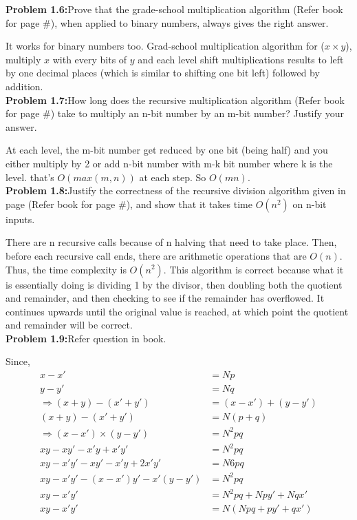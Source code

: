 \documentclass[11pt]{article}
\begin{document}
	\textbf{Problem 1.6:}Prove that the grade-school multiplication algorithm (Refer book for page \#), when applied to binary numbers, always gives the right answer.
	
	It works for binary numbers too. Grad-school multiplication algorithm for ($x\times y$), multiply $x$ with every bits of $y$ and each level shift multiplications results to left by one decimal places (which is similar to shifting one bit left) followed by addition.\\
	
	\textbf{Problem 1.7:}How long does the recursive multiplication algorithm (Refer book for page \#) take to multiply	an n-bit number by an m-bit number? Justify your answer.
	
	At each level, the m-bit number get reduced by one bit (being half) and you either multiply by 2 or add n-bit number with m-k bit number where k is the level. that's $O(max(m,n))$ at each step. So $O(mn)$.\\
	
	\textbf{Problem 1.8:}Justify the correctness of the recursive division algorithm given in page (Refer book for page \#), and show that it takes time $O(n^2)$ on n-bit inputs.	
	
	There are n recursive calls because of n halving that need to take place. Then, before each recursive call ends, there are arithmetic operations that are $O(n)$.
	Thus, the time complexity is $O(n^2)$. This algorithm is correct because what it is essentially doing is dividing 1 by the divisor, then doubling both the quotient and remainder, and then checking to see if the remainder has overflowed. It continues upwards until the original value is reached, at which point the quotient	and remainder will be correct.\\
	
	\textbf{Problem 1.9:}Refer question in book.
	
	Since,
	\begin{align*}
	x - x' &= Np\\
	y - y' &= Nq\\
	\Rightarrow (x+y) - (x' + y') &= (x - x') + (y - y')\\
	(x+y) - (x' + y') &= N(p+q)\\
	\Rightarrow (x - x')\times(y - y') &= N^2pq\\
	xy - xy' - x'y + x'y' &= N^2pq\\
	xy - x'y' - xy' - x'y + 2x'y' &= N6pq\\
	xy - x'y' -(x - x')y' - x'(y - y') &= N^2pq\\
	xy - x'y' &= N^2pq + Npy' + Nqx'\\
	xy - x'y' &= N(Npq + py'+ qx')
	\end{align*}
	
\end{document}
